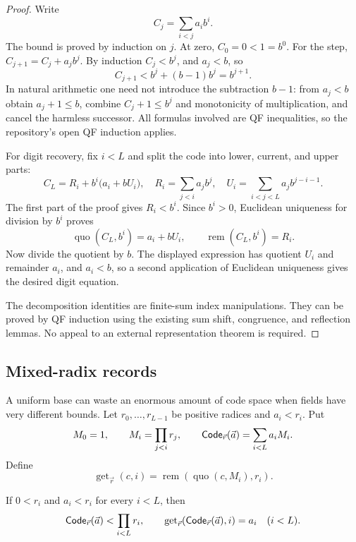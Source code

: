 \begin{proof}
Write
\[
  C_j=\sum_{i<j}a_i b^i.
\]
The bound is proved by induction on \(j\).  At zero, \(C_0=0<1=b^0\).
For the step, \(C_{j+1}=C_j+a_jb^j\).  By induction \(C_j<b^j\), and
\(a_j<b\), so
\[
  C_{j+1}<b^j+(b-1)b^j=b^{j+1}.
\]
In natural arithmetic one need not introduce the subtraction \(b-1\): from
\(a_j<b\) obtain \(a_j+1\le b\), combine
\(C_j+1\le b^j\) and monotonicity of multiplication, and cancel the harmless
successor.  All formulas involved are QF inequalities, so the repository's
open QF induction applies.

For digit recovery, fix \(i<L\) and split the code into lower, current, and
upper parts:
\[
 C_L=R_i+b^i\bigl(a_i+bU_i\bigr),
 \quad
 R_i=\sum_{j<i}a_jb^j,
 \quad
 U_i=\sum_{i<j<L}a_jb^{j-i-1}.
\]
The first part of the proof gives \(R_i<b^i\).  Since \(b^i>0\), Euclidean
uniqueness for division by \(b^i\) proves
\[
  \operatorname{quo}(C_L,b^i)=a_i+bU_i,
  \qquad
  \operatorname{rem}(C_L,b^i)=R_i.
\]
Now divide the quotient by \(b\).  The displayed expression has quotient
\(U_i\) and remainder \(a_i\), and \(a_i<b\), so a second application of
Euclidean uniqueness gives the desired digit equation.

The decomposition identities are finite-sum index manipulations.  They can be
proved by QF induction using the existing sum shift, congruence, and reflection
lemmas.  No appeal to an external representation theorem is required.
\end{proof}

\subsection{Mixed-radix records}

A uniform base can waste an enormous amount of code space when fields have
very different bounds.  Let \(r_0,\ldots,r_{L-1}\) be positive radices and
\(a_i<r_i\).  Put
\[
  M_0=1,
  \qquad M_i=\prod_{j<i}r_j,
  \qquad
  \mathsf{Code}_{\vec r}(\vec a)=\sum_{i<L}a_iM_i.
\]
Define
\[
  \operatorname{get}_{\vec r}(c,i)
   =\operatorname{rem}
      \left(\operatorname{quo}(c,M_i),r_i\right).
\]

\begin{theorem}\label{thm:mixed-code}
If \(0<r_i\) and \(a_i<r_i\) for every \(i<L\), then
\[
  \mathsf{Code}_{\vec r}(\vec a)<\prod_{i<L}r_i,
  \qquad
  \operatorname{get}_{\vec r}(\mathsf{Code}_{\vec r}(\vec a),i)=a_i
  \quad(i<L).
\]
\end{theorem}

